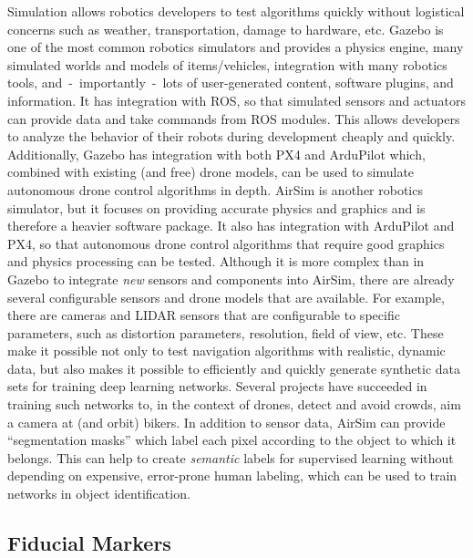 Simulation allows robotics developers to test algorithms quickly without logistical concerns such as
weather, transportation, damage to hardware, etc.
Gazebo is one of the most common robotics simulators and provides a physics engine,
many simulated worlds and models of items/vehicles,
integration with many robotics tools,
and~-~importantly~-~lots of user-generated content, software plugins, and information.
It has integration with ROS, so that simulated sensors and actuators can provide data and take commands
from ROS modules.
This allows developers to analyze the behavior of their robots during development cheaply and quickly.
Additionally, Gazebo has integration with both PX4 and ArduPilot which, combined with existing (and free)
drone models, can be used to simulate autonomous drone control algorithms in depth.
AirSim is another robotics simulator, but it focuses on providing accurate physics and graphics
and is therefore a heavier software package.
It also has integration with ArduPilot and PX4, so that autonomous drone control algorithms
that require good graphics and physics processing can be tested.
Although it is more complex than in Gazebo to integrate \textit{new} sensors and components into
AirSim, there are already several configurable sensors and drone models that are available.
For example, there are cameras and LIDAR sensors that are configurable to specific parameters,
such as distortion parameters, resolution, field of view, etc.
These make it possible not only to test navigation algorithms with realistic, dynamic data,
but also makes it possible to efficiently and quickly generate synthetic data sets for training
deep learning networks.
Several projects have succeeded in training such networks to, in the context of drones,
detect and avoid crowds,
aim a camera at (and orbit) bikers.
In addition to sensor data, AirSim can provide ``segmentation masks'' which label each pixel
according to the object to which it belongs.
This can help to create \textit{semantic} labels for supervised learning without depending
on expensive, error-prone human labeling,
which can be used to train networks in object identification.

\subsection{Fiducial Markers}

